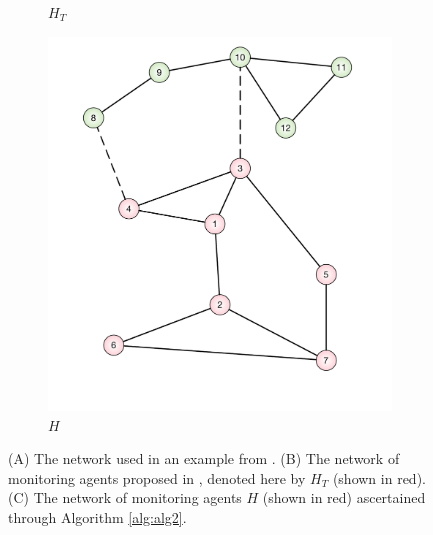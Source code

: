 \documentclass[reqno,8pt]{amsart}
\theoremstyle{definition}
\theoremstyle{remark}
\numberwithin{equation}{section}
\begin{document}
\begin{figure}
\begin{subfigure}{.2\textwidth}
  \caption{$H_T$}
  \label{fig:TeixierasNetworkH}
\end{subfigure}
\begin{subfigure}{.2\textwidth}
  \centering
  \includegraphics[width=.8\linewidth]{OurProposal.pdf}
  \caption{$H$}
  \label{fig:OurProposal}
\end{subfigure}
\caption{(A) The network used in an example from \cite{teixeira_distributed_2014}. (B) The network of monitoring agents proposed in \cite{teixeira_distributed_2014}, denoted here by $H_T$ (shown in red). (C) The network of monitoring agents $H$ (shown in red) ascertained through Algorithm \ref{alg:alg2}.}
\label{fig:fig}
\end{figure}


\end{document}
